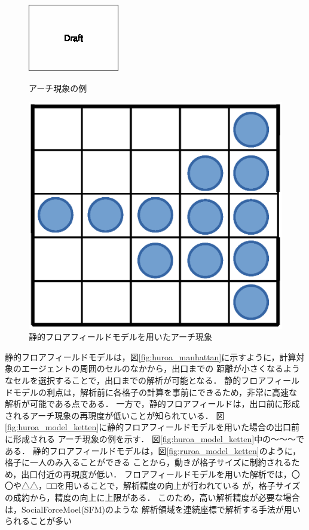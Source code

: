 \begin{figure}[t]
	\begin{minipage}[b]{0.45\linewidth}
		\centering
		\includegraphics[keepaspectratio, scale=2.5]{figure/draft.eps}
		\caption{アーチ現象の例}
		\label{fig:a-tigenshou}
	\end{minipage}
	\begin{minipage}[b]{0.45\linewidth}
		\centering
		\includegraphics[keepaspectratio, scale=0.35]{figure/floormodel_ex2.eps}
		\caption{静的フロアフィールドモデルを用いたアーチ現象}
		\label{fig:floormodel_ex2}
	\end{minipage}
\end{figure}


静的フロアフィールドモデルは，図\ref{fig:huroa_manhattan}に示すように，計算対象のエージェントの周囲のセルのなかから，出口までの
距離が小さくなるようなセルを選択することで，出口までの解析が可能となる．
静的フロアフィールドモデルの利点は，解析前に各格子の計算を事前にできるため，非常に高速な
解析が可能である点である．
一方で，静的フロアフィールドは，出口前に形成されるアーチ現象の再現度が低いことが知られている．
図\ref{fig:huroa_model_ketten}に静的フロアフィールドモデルを用いた場合の出口前に形成される
アーチ現象の例を示す．
図\ref{fig:huroa_model_ketten}中の～～～である．
静的フロアフィールドモデルは，図\ref{fig;ruroa_model_ketten}のように，格子に一人のみ入ることができる
ことから，動きが格子サイズに制約されるため，出口付近の再現度が低い．
フロアフィールドモデルを用いた解析では，〇〇や△△，□□を用いることで，解析精度の向上が行われている
が，格子サイズの成約から，精度の向上に上限がある．
このため，高い解析精度が必要な場合は，SocialForceMoel(SFM)のような
解析領域を連続座標で解析する手法が用いられることが多い

